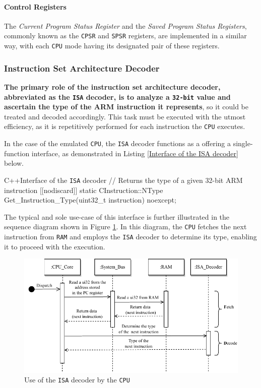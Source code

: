 \documentclass[english, ing, kiv, he, iso690numb, pdf]{fasthesis}
\begin{document}
	\paragraph{Control Registers}
	
	The \textit{Current Program Status Register} and the \textit{Saved Program Status Registers}, commonly known as the \texttt{CPSR} and \texttt{SPSR} registers, are implemented in a similar way, with each \texttt{CPU} mode having its designated pair of these registers.
	
	\subsubsection{Instruction Set Architecture Decoder}
	
	\textbf{The primary role of the instruction set architecture decoder, abbreviated as the \texttt{ISA} decoder, is to analyze a \texttt{32-bit} value and ascertain the type of the ARM instruction it represents}, so it could be treated and decoded accordingly. This task must be executed with the utmost efficiency, as it is repetitively performed for each instruction the \texttt{CPU} executes.
	
	In the case of the emulated \texttt{CPU}, the \texttt{ISA} decoder functions as a  offering a single-function interface, as demonstrated in Listing \ref{Interface of the ISA decoder} below.
	
\begin{code}{C++}{Interface of the \texttt{ISA} decoder\label{Interface of the ISA decoder}}
// Returns the type of a given 32-bit ARM instruction
[[nodiscard]] static CInstruction::NType 
Get_Instruction_Type(uint32_t instruction) noexcept;
\end{code}
	
	The typical and sole use-case of this interface is further illustrated in the sequence diagram shown in Figure \ref{Use of the ISA decoder by the CPU}. In this diagram, the \texttt{CPU} fetches the next instruction from \texttt{RAM} and employs the \texttt{ISA} decoder to determine its type, enabling it to proceed with the execution.
	
	\newpage
	
	\begin{figure}[ht]
		\centering
		\includegraphics[width=1.0\textwidth]{img/diagrams/isa_decoder.pdf}
		\caption{Use of the \texttt{ISA} decoder by the \texttt{CPU}}
		\label{Use of the ISA decoder by the CPU}
	\end{figure}
	
\end{document}
